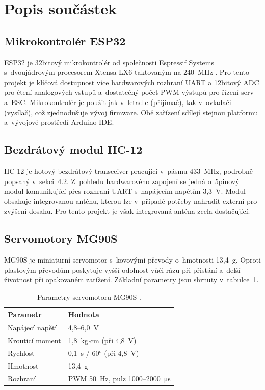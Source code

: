 \documentclass[12pt, a4paper, oneside]{report}
\begin{document}
\section{Popis součástek}
 
\subsection{Mikrokontrolér ESP32}
 
ESP32 je 32bitový mikrokontrolér od společnosti Espressif Systems
s~dvoujádrovým procesorem Xtensa LX6 taktovaným na 240~MHz \cite{esp32}.
Pro tento projekt je klíčová dostupnost více hardwarových rozhraní
UART a 12bitový ADC pro čtení analogových vstupů
a~dostatečný počet PWM výstupů pro řízení serv a~ESC.
Mikrokontrolér je použit jak v~letadle (přijímač), tak v~ovladači (vysílač),
což zjednodušuje vývoj firmware. Obě zařízení sdílejí stejnou platformu
a~vývojové prostředí Arduino IDE.
 
\subsection{Bezdrátový modul HC-12}
 
HC-12 je hotový bezdrátový transceiver pracující v~pásmu 433~MHz,
podrobně popsaný v~sekci~4.2. Z~pohledu hardwarového zapojení
se jedná o~5pinový modul komunikující
přes rozhraní UART s~napájecím napětím 3{,}3~V.
Modul obsahuje integrovanou anténu, kterou lze v~případě potřeby
nahradit externí pro zvýšení dosahu. Pro tento projekt je však integrovaná anténa zcela dostačující.
 
\subsection{Servomotory MG90S}
 
MG90S je miniaturní servomotor s~kovovými převody o~hmotnosti 13{,}4~g.
Oproti plastovým převodům poskytuje vyšší odolnost vůči rázu při přistání
a~delší životnost při opakovaném zatížení. Základní parametry jsou
shrnuty v~tabulce~\ref{tab:mg90s}.
 
\begin{table}[H]
    \centering
    \caption{Parametry servomotoru MG90S \cite{mg90s}.}
    \label{tab:mg90s}
    \begin{tabular}{ll}
        \toprule
        Parametr & Hodnota \\
        \midrule
        Napájecí napětí   & 4{,}8--6{,}0~V \\
        Krouticí moment   & 1{,}8~kg$\cdot$cm (při 4{,}8~V) \\
        Rychlost    & 0{,}1~s / 60° (při 4{,}8~V) \\
        Hmotnost    & 13{,}4~g \\
        Rozhraní    & PWM 50~Hz, pulz 1000--2000~\si{\micro\second} \\
        \bottomrule
    \end{tabular}
\end{table}
 
\end{document}
